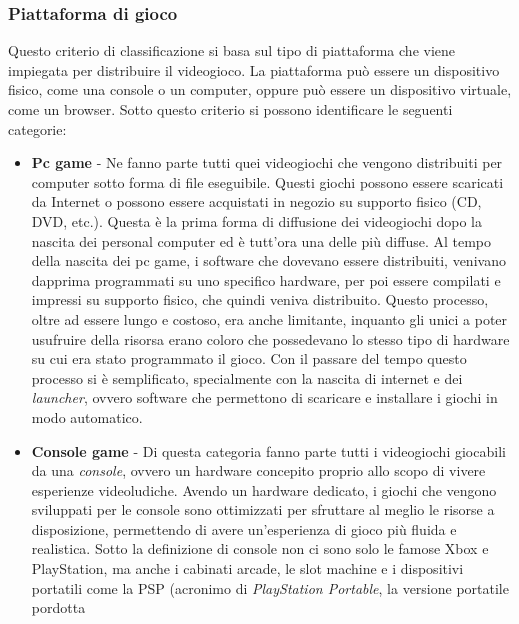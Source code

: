         \subsubsection{Piattaforma di gioco}
            Questo criterio di classificazione si basa sul tipo di piattaforma che viene impiegata per distribuire il videogioco. La piattaforma può essere un dispositivo fisico, come
            una console o un computer, oppure può essere un dispositivo virtuale, come un browser. Sotto questo criterio si possono identificare le seguenti categorie:
            \begin{itemize}
                \item \textbf{Pc game} - Ne fanno parte tutti quei videogiochi che vengono distribuiti per computer sotto forma di file eseguibile. Questi giochi possono essere
                    scaricati da Internet o possono essere acquistati in negozio su supporto fisico (CD, DVD, etc.). Questa è la prima forma di diffusione dei videogiochi dopo la
                    nascita dei personal computer ed è tutt'ora una delle più diffuse. Al tempo della nascita dei pc game, i software che dovevano essere distribuiti, venivano dapprima
                    programmati su uno specifico hardware, per poi essere compilati e impressi su supporto fisico, che quindi veniva distribuito. Questo processo, oltre ad essere
                    lungo e costoso, era anche limitante, inquanto gli unici a poter usufruire della risorsa erano coloro che possedevano lo stesso tipo di hardware su cui era
                    stato programmato il gioco. Con il passare del tempo questo processo si è semplificato, specialmente con la nascita di internet e dei \textit{launcher}, ovvero
                    software che permettono di scaricare e installare i giochi in modo automatico.
                \item \textbf{Console game} - Di questa categoria fanno parte tutti i videogiochi giocabili da una \textit{console}, ovvero un hardware concepito proprio allo scopo
                    di vivere esperienze videoludiche. Avendo un hardware dedicato, i giochi che vengono sviluppati per le console sono ottimizzati per sfruttare al meglio le risorse
                    a disposizione, permettendo di avere un'esperienza di gioco più fluida e realistica. Sotto la definizione di console non ci sono solo le famose Xbox e PlayStation,
                    ma anche i cabinati arcade, le slot machine e i dispositivi portatili come la PSP (acronimo di \textit{PlayStation Portable}, la versione portatile pordotta 

\end{itemize}
